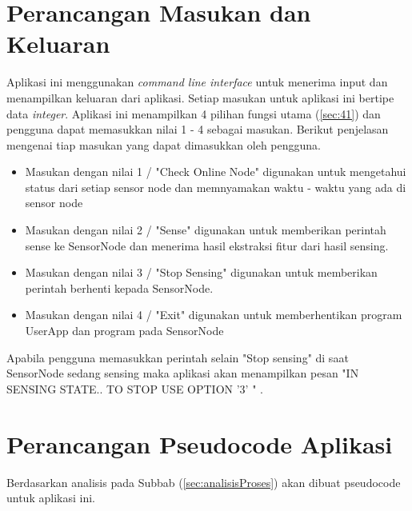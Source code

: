 \section{Perancangan Masukan dan Keluaran}
Aplikasi ini menggunakan {\it command line interface} untuk menerima input dan menampilkan keluaran dari aplikasi. Setiap masukan untuk aplikasi ini bertipe data {\it integer}. Aplikasi ini menampilkan 4 pilihan fungsi utama (\ref{sec:41}) dan pengguna dapat memasukkan nilai 1 - 4 sebagai masukan. Berikut penjelasan mengenai tiap masukan yang dapat dimasukkan oleh pengguna.
\begin{itemize}
	\item Masukan dengan nilai 1 / "Check Online Node" digunakan untuk mengetahui status dari setiap sensor node dan memnyamakan waktu - waktu yang ada di sensor node
	\item Masukan dengan nilai 2 / "Sense" digunakan untuk memberikan perintah sense ke SensorNode dan menerima hasil ekstraksi fitur dari hasil sensing.
	\item Masukan dengan nilai 3 / "Stop Sensing" digunakan untuk memberikan perintah berhenti kepada SensorNode.
	\item Masukan dengan nilai 4 / "Exit" digunakan untuk memberhentikan program UserApp dan program pada SensorNode
\end{itemize} 
Apabila pengguna memasukkan perintah selain "Stop sensing" di saat SensorNode sedang sensing maka aplikasi akan menampilkan pesan "IN SENSING STATE.. TO STOP USE OPTION '3' " .

\section{Perancangan Pseudocode Aplikasi}
Berdasarkan analisis pada Subbab (\ref{sec:analisisProses}) akan dibuat pseudocode untuk aplikasi ini. 

